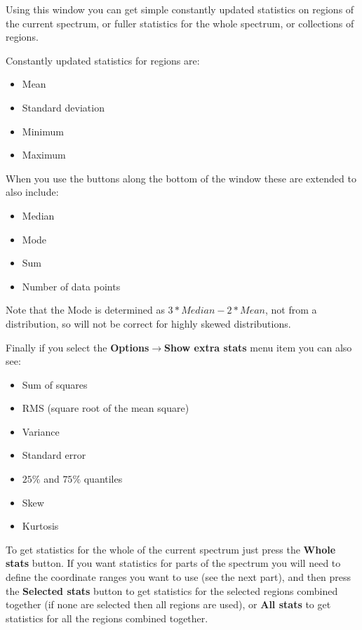 \documentclass[twoside,11pt]{article}
\newcommand{\latexhtml}[2]{#1}
\renewcommand{\_}{\texttt{\symbol{95}}}
\newcommand{\submenuitem}[2]{\latexhtml{\textbf{#1$\rightarrow$#2}}{\textbf{#1->#2}}}
\newcommand{\labelitem}[1]{\textbf{#1}}
\begin{document}
Using this window you can get simple constantly updated statistics on regions
of the current spectrum, or fuller statistics for the whole spectrum, or
collections of regions.

Constantly updated statistics for regions are:
\begin{itemize}
\item Mean
\item Standard deviation
\item Minimum
\item Maximum
\end{itemize}

When you use the buttons along the bottom of the window these are extended to
also include:
\begin{itemize}
\item Median
\item Mode
\item Sum
\item Number of data points
\end{itemize}
Note that the Mode is determined as $3*Median-2*Mean$, not from a
distribution, so will not be correct for highly skewed distributions.

Finally if you select the \submenuitem{Options}{Show extra stats} menu item
you can also see:
\begin{itemize}
\item Sum of squares
\item RMS (square root of the mean square)
\item Variance
\item Standard error
\item $25\%$ and $75\%$ quantiles
\item Skew
\item Kurtosis
\end{itemize}

To get statistics for the whole of the current spectrum just press the
\labelitem{Whole stats} button. If you want statistics for parts of the
spectrum you will need to define the coordinate ranges you want to use (see
the next part), and then press the \labelitem{Selected stats} button to get
statistics for the selected regions combined together (if none are selected
then all regions are used), or \labelitem{All stats} to get statistics for all
the regions combined together.
\end{document}

